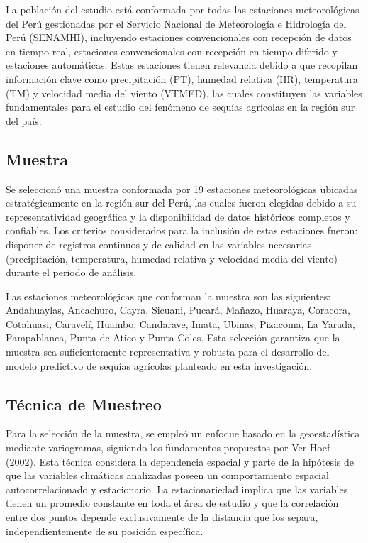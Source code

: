 La población del estudio está conformada por todas las estaciones meteorológicas del Perú gestionadas por el Servicio Nacional de Meteorología e Hidrología del Perú (SENAMHI), incluyendo estaciones convencionales con recepción de datos en tiempo real, estaciones convencionales con recepción en tiempo diferido y estaciones automáticas. Estas estaciones tienen relevancia debido a que recopilan información clave como precipitación (PT), humedad relativa (HR), temperatura (TM) y velocidad media del viento (VTMED), las cuales constituyen las variables fundamentales para el estudio del fenómeno de sequías agrícolas en la región sur del país.

\subsection{Muestra}

Se seleccionó una muestra conformada por 19 estaciones meteorológicas ubicadas estratégicamente en la región sur del Perú, las cuales fueron elegidas debido a su representatividad geográfica y la disponibilidad de datos históricos completos y confiables. Los criterios considerados para la inclusión de estas estaciones fueron: disponer de registros continuos y de calidad en las variables necesarias (precipitación, temperatura, humedad relativa y velocidad media del viento) durante el periodo de análisis.

Las estaciones meteorológicas que conforman la muestra son las siguientes: Andahuaylas, Ancachuro, Cayra, Sicuani, Pucará, Mañazo, Huaraya, Coracora, Cotahuasi, Caravelí, Huambo, Candarave, Imata, Ubinas, Pizacoma, La Yarada, Pampablanca, Punta de Atico y Punta Coles. Esta selección garantiza que la muestra sea suficientemente representativa y robusta para el desarrollo del modelo predictivo de sequías agrícolas planteado en esta investigación.

\subsection{Técnica de Muestreo}

Para la selección de la muestra, se empleó un enfoque basado en la geoestadística mediante variogramas, siguiendo los fundamentos propuestos por Ver Hoef (2002). Esta técnica considera la dependencia espacial y parte de la hipótesis de que las variables climáticas analizadas poseen un comportamiento espacial autocorrelacionado y estacionario. La estacionariedad implica que las variables tienen un promedio constante en toda el área de estudio y que la correlación entre dos puntos depende exclusivamente de la distancia que los separa, independientemente de su posición específica.

